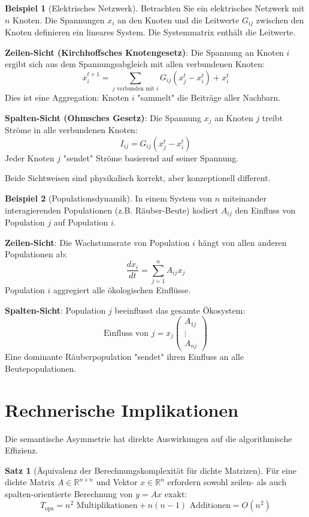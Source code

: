 ﻿\documentclass[a4paper,12pt]{report}
\theoremstyle{definition}
\newtheorem{beispiel}{Beispiel}
\newtheorem{satz}{Satz}
\begin{document}
	\begin{beispiel}[Elektrisches Netzwerk]
		Betrachten Sie ein elektrisches Netzwerk mit $n$ Knoten. Die Spannungen $x_i$ an den Knoten und die Leitwerte $G_{ij}$ zwischen den Knoten definieren ein lineares System. Die Systemmatrix enthält die Leitwerte.
		
		\textbf{Zeilen-Sicht (Kirchhoffsches Knotengesetz)}:
		Die Spannung an Knoten $i$ ergibt sich aus dem Spannungsabgleich mit allen verbundenen Knoten:
		\[
		x_i^{t+1} = \sum_{j \text{ verbunden mit } i} G_{ij} (x_j^t - x_i^t) + x_i^t
		\]
		Dies ist eine Aggregation: Knoten $i$ "sammelt" die Beiträge aller Nachbarn.
		
		\textbf{Spalten-Sicht (Ohmsches Gesetz)}:
		Die Spannung $x_j$ an Knoten $j$ treibt Ströme in alle verbundenen Knoten:
		\[
		I_{ij} = G_{ij}(x_j^t - x_i^t)
		\]
		Jeder Knoten $j$ "sendet" Ströme basierend auf seiner Spannung.
		
		Beide Sichtweisen sind physikalisch korrekt, aber konzeptionell different.
	\end{beispiel}
	
	\begin{beispiel}[Populationsdynamik]
		In einem System von $n$ miteinander interagierenden Populationen (z.B. Räuber-Beute) kodiert $A_{ij}$ den Einfluss von Population $j$ auf Population $i$.
		
		\textbf{Zeilen-Sicht}: Die Wachstumsrate von Population $i$ hängt von allen anderen Populationen ab:
		\[
		\frac{dx_i}{dt} = \sum_{j=1}^n A_{ij} x_j
		\]
		Population $i$ aggregiert alle ökologischen Einflüsse.
		
		\textbf{Spalten-Sicht}: Population $j$ beeinflusst das gesamte Ökosystem:
		\[
		\text{Einfluss von } j = x_j \begin{pmatrix} A_{1j} \\ \vdots \\ A_{nj} \end{pmatrix}
		\]
		Eine dominante Räuberpopulation "sendet" ihren Einfluss an alle Beutepopulationen.
	\end{beispiel}
	
	\section{Rechnerische Implikationen}
	
	Die semantische Asymmetrie hat direkte Auswirkungen auf die algorithmische Effizienz.
	
	\begin{satz}[Äquivalenz der Berechnungskomplexität für dichte Matrizen]
		Für eine dichte Matrix $A \in \mathbb{R}^{n \times n}$ und Vektor $x \in \mathbb{R}^n$ erfordern sowohl zeilen- als auch spalten-orientierte Berechnung von $y = Ax$ exakt:
		\[
		T_{\text{ops}} = n^2 \text{ Multiplikationen} + n(n-1) \text{ Additionen} = O(n^2)
		\]
	\end{satz}
	
\end{document}
